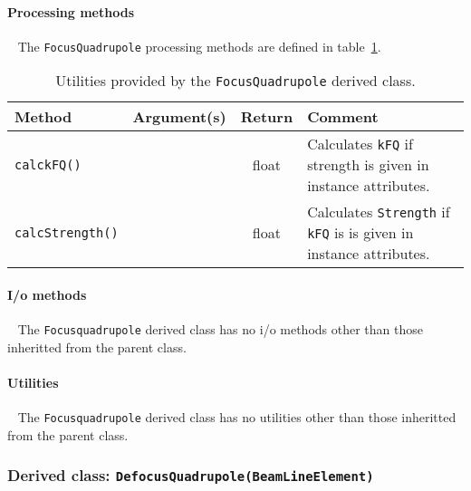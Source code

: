 \paragraph{Processing methods} ~\newline
\noindent
The \texttt{FocusQuadrupole} processing methods are defined in
table~\ref{Tab:FQuad:Methods}.
\begin{table}[h]
  \caption{
    Utilities provided by the \texttt{FocusQuadrupole} derived
    class. 
  }
  \label{Tab:FQuad:Methods}
  \begin{center}
    \begin{tabular}{|l|c|c|p{7cm}|}
      \hline
      \textbf{Method} & \textbf{Argument(s)} & \textbf{Return} & \textbf{Comment}                     \\
      \hline
      \texttt{calckFQ()} &  & float & Calculates \texttt{kFQ} if strength is given in instance attributes. \\
      \texttt{calcStrength()} &  & float & Calculates \texttt{Strength} if \texttt{kFQ} is is given in instance attributes. \\
      \hline
    \end{tabular}
  \end{center}
\end{table}

\paragraph{I/o methods} ~\newline
\noindent
The \texttt{Focusquadrupole} derived class has no i/o methods other than
those inheritted from the parent class.

\paragraph{Utilities} ~\newline
\noindent
The \texttt{Focusquadrupole} derived class has no utilities other than those
inheritted from the parent class. 


\subsubsection{Derived class: \texttt{DefocusQuadrupole(BeamLineElement)}}

